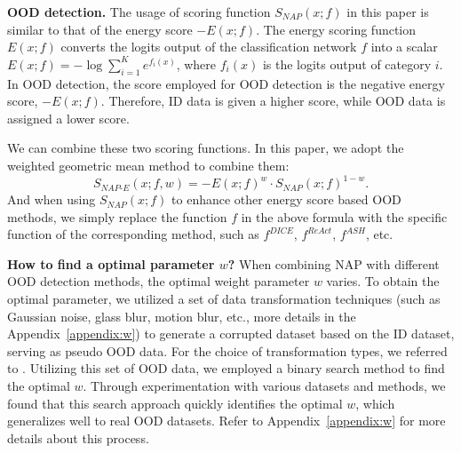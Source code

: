 \noindent\textbf{OOD detection.}
The usage of scoring function $S_{\textit{NAP}}(x;f)$ in this paper is similar to that of the energy score $-E(x;f)$. The energy scoring function \(E(x; f)\) converts the logits output of the classification network \(f\) into a scalar \(E(x; f) = - \log \sum_{i=1}^{K} e^{f_i(x)}\), where \(f_i(x)\) is the logits output of category \(i\). In OOD detection, the score employed for OOD detection is the negative energy score, \(-E(x; f)\). Therefore, ID data is given a higher score, while OOD data is assigned a lower score.

We can combine these two scoring functions. In this paper, we adopt the weighted geometric mean method to combine them:
\begin{equation}
    S_{\textit{NAP-E}}(x;f,w)=-E(x;f)^w\cdot S_{\textit{NAP}}(x;f)^{1-w}. 
\end{equation}
And when using $S_{\textit{NAP}}(x;f)$ to enhance other energy score based OOD methods, we simply replace the function $f$ in the above formula with the specific function of the corresponding method, such as \(f^{\textit{DICE}}\), \(f^{\textit{ReAct}}\), \(f^{\textit{ASH}}\), etc.

\noindent\textbf{How to find a optimal parameter \(w\)?}
\label{sec:how_to_find_w}
When combining NAP with different OOD detection methods, the optimal weight parameter \(w\) varies. To obtain the optimal parameter, we utilized a set of data transformation techniques (such as Gaussian noise, glass blur, motion blur, etc., more details in the Appendix~\ref{appendix:w}) to generate a corrupted dataset based on the ID dataset, serving as pseudo OOD data. For the choice of transformation types, we referred to \cite{hendrycks2018corp}. Utilizing this set of OOD data, we employed a binary search method to find the optimal \(w\). Through experimentation with various datasets and methods, we found that this search approach quickly identifies the optimal \(w\), which generalizes well to real OOD datasets. Refer to Appendix~\ref{appendix:w} for more details about this process.

